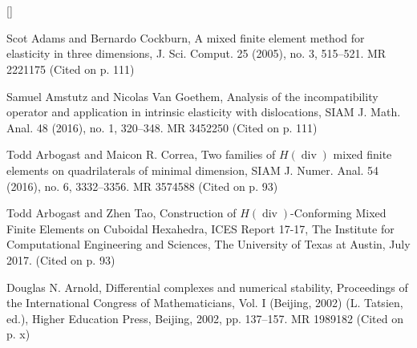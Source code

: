 \clearpage\section*{}\label{back:bibliography}
\begin{list}{[]}{\setlength{\leftmargin}{2.7em}\setlength{\labelwidth}{2.2em}}\small

\item\label{bib:source-1}Scot Adams and Bernardo Cockburn, A mixed finite element method for elasticity in three dimensions, J. Sci. Comput. 25 (2005), no. 3, 515–521. MR 2221175 (Cited on p. 111)

\item\label{bib:source-2}Samuel Amstutz and Nicolas Van Goethem, Analysis of the incompatibility operator and application in intrinsic elasticity with dislocations, SIAM J. Math. Anal. 48 (2016), no. 1, 320–348. MR 3452250 (Cited on p. 111)

\item\label{bib:source-3}Todd Arbogast and Maicon R. Correa, Two families of $H(\operatorname{div})$ mixed finite elements on quadrilaterals of minimal dimension, SIAM J. Numer. Anal. 54 (2016), no. 6, 3332–3356. MR 3574588 (Cited on p. 93)

\item\label{bib:source-4}Todd Arbogast and Zhen Tao, Construction of $H(\operatorname{div})$-Conforming Mixed Finite Elements on Cuboidal Hexahedra, ICES Report 17-17, The Institute for Computational Engineering and Sciences, The University of Texas at Austin, July 2017. (Cited on p. 93)

\item\label{bib:source-5}Douglas N. Arnold, Differential complexes and numerical stability, Proceedings of the International Congress of Mathematicians, Vol. I (Beijing, 2002) (L. Tatsien, ed.), Higher Education Press, Beijing, 2002, pp. 137–157. MR 1989182 (Cited on p. x)


\end{list}
